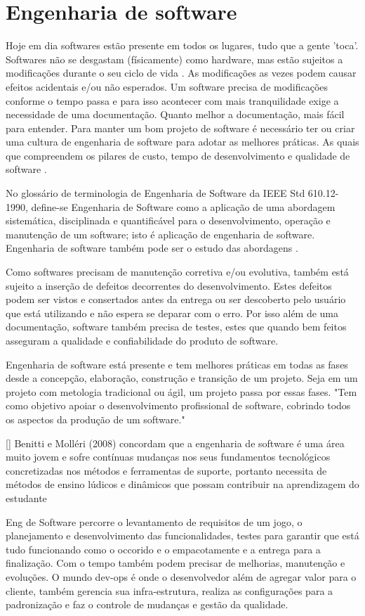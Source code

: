 \section[Engenharia de software]{Engenharia de software}
Hoje em dia softwares estão presente em todos os lugares, tudo que a gente 'toca'. Softwares não se desgastam (físicamente) como hardware, mas estão sujeitos a modificações durante o seu ciclo de vida \cite{Silva_filho}. As modificações as vezes podem causar efeitos acidentais e/ou não esperados. Um software precisa de modificações conforme o tempo passa e para isso acontecer com mais tranquilidade exige a necessidade de uma documentação. Quanto melhor a documentação, mais fácil para entender. Para manter um bom projeto de software é necessário ter ou criar uma cultura de engenharia de software para adotar as melhores práticas. As quais que compreendem os pilares de custo, tempo de desenvolvimento e qualidade de software \cite{Silva_filho}.

No glossário de terminologia de Engenharia de Software da IEEE Std 610.12-1990, define-se Engenharia de Software como a aplicação de uma abordagem sistemática, disciplinada e quantificável para o desenvolvimento, operação e manutenção de um software; isto é aplicação de engenharia de software. Engenharia de software também pode ser o estudo das abordagens \cite{ieeeTerminology}.

Como softwares precisam de manutenção corretiva e/ou evolutiva, também está sujeito a inserção de defeitos decorrentes do desenvolvimento. Estes defeitos podem ser vistos e consertados antes da entrega \cite{Silva_filho} ou ser descoberto pelo usuário que está utilizando e não espera se deparar com o erro. Por isso além de uma documentação, software também precisa de testes, estes que quando bem feitos asseguram a qualidade e confiabilidade do produto de software.


Engenharia de software está presente e tem melhores práticas em todas as fases desde a concepção, elaboração, construção e transição de um projeto. Seja em um projeto com metologia tradicional ou ágil, um projeto passa por essas fases.
"Tem como objetivo apoiar o desenvolvimento profissional de software, cobrindo todos os aspectos da produção de um software."

[\cite{sucessoJogoEngSoft}] Benitti e Molléri (2008) concordam que a engenharia de software é uma área muito jovem e sofre contínuas mudanças nos seus fundamentos tecnológicos concretizadas nos métodos e ferramentas de suporte, portanto necessita de métodos de ensino lúdicos e dinâmicos que possam contribuir na aprendizagem do estudante



Eng de Software percorre o levantamento de requisitos de um jogo, o planejamento e desenvolvimento das funcionalidades, testes para garantir que está tudo funcionando como o occorido e o empacotamente e a entrega para a finalização. Com o tempo também podem precisar de melhorias, manutenção e evoluções. O mundo dev-ops é onde o desenvolvedor além de agregar valor para o cliente, também gerencia sua infra-estrutura, realiza as configurações para a padronização e faz o controle de mudanças e gestão da qualidade.

